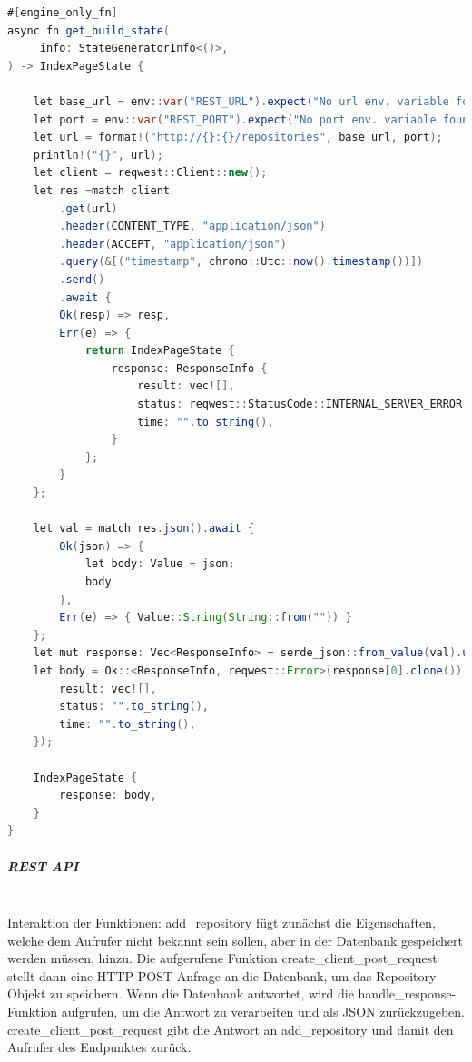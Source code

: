\documentclass[notitlepage, hidelinks]{article}
\begin{document}
\begin{lstlisting}[language=Java,frame=single,caption=Aufruf des Get Endpunktes für die Repositories im Client,label=clienttwo]
#[engine_only_fn]
async fn get_build_state(
    _info: StateGeneratorInfo<()>,
) -> IndexPageState {

    let base_url = env::var("REST_URL").expect("No url env. variable found");
    let port = env::var("REST_PORT").expect("No port env. variable found");
    let url = format!("http://{}:{}/repositories", base_url, port);
    println!("{}", url);
    let client = reqwest::Client::new();
    let res =match client
        .get(url)
        .header(CONTENT_TYPE, "application/json")
        .header(ACCEPT, "application/json")
        .query(&[("timestamp", chrono::Utc::now().timestamp())])
        .send()
        .await {
        Ok(resp) => resp,
        Err(e) => {
            return IndexPageState {
                response: ResponseInfo {
                    result: vec![],
                    status: reqwest::StatusCode::INTERNAL_SERVER_ERROR.to_string(),
                    time: "".to_string(),
                }
            };
        }
    };

    let val = match res.json().await {
        Ok(json) => {
            let body: Value = json;
            body
        },
        Err(e) => { Value::String(String::from("")) }
    };
    let mut response: Vec<ResponseInfo> = serde_json::from_value(val).unwrap_or(vec![]);
    let body = Ok::<ResponseInfo, reqwest::Error>(response[0].clone()).unwrap_or(ResponseInfo {
        result: vec![],
        status: "".to_string(),
        time: "".to_string(),
    });

    IndexPageState {
        response: body,
    }
}
\end{lstlisting}


\subparagraph{REST API} \mbox{} \\

Interaktion der Funktionen: add\_repository fügt zunächst die Eigenschaften, welche dem Aufrufer nicht bekannt sein sollen, aber in der Datenbank gespeichert werden müssen, hinzu. Die aufgerufene Funktion create\_client\_post\_request stellt dann eine HTTP-POST-Anfrage an die Datenbank, um das Repository-Objekt zu speichern. Wenn die Datenbank antwortet, wird die handle\_response-Funktion aufgrufen, um die Antwort zu verarbeiten und als JSON zurückzugeben. create\_client\_post\_request gibt die Antwort an add\_repository und damit den Aufrufer des Endpunktes zurück. 
\end{document}
